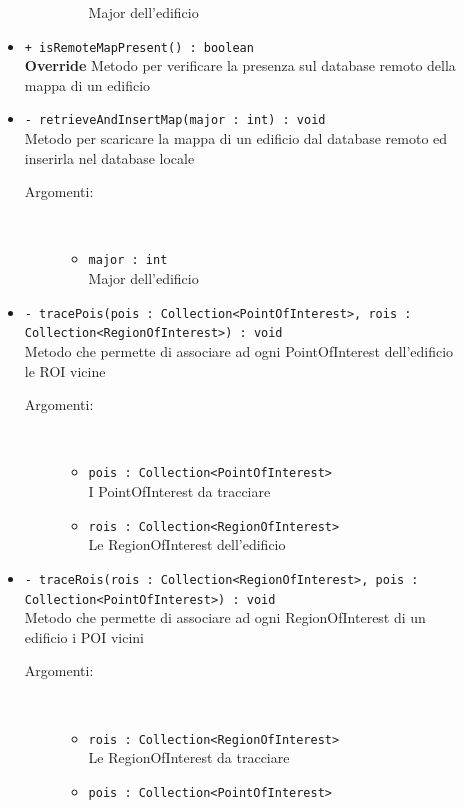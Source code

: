 \documentclass[../DefinizioneDiProdotto.tex]{subfiles}
\begin{document}
\begin{description}
\begin{itemize}
\begin{description}
\begin{itemize}
				Major dell'edificio\end{itemize}
		\end{description}
		\item \texttt{+ isRemoteMapPresent() : boolean}\\
		\textbf{Override} Metodo per verificare la presenza sul database remoto della mappa di un edificio
		\item \texttt{- retrieveAndInsertMap(major : int) : void}\\
		Metodo per scaricare la mappa di un edificio dal database remoto ed inserirla nel database locale
		\begin{description}
			\item[Argomenti:] \
			\begin{itemize}
				\item \texttt{major : int}\\
				Major dell'edificio\end{itemize}
		\end{description}
		\item \texttt{- tracePois(pois : Collection<PointOfInterest>, rois : Collection<RegionOfInterest>) : void}\\
		Metodo che permette di associare ad ogni PointOfInterest dell'edificio le ROI vicine
		\begin{description}
			\item[Argomenti:] \
			\begin{itemize}
				\item \texttt{pois : Collection<PointOfInterest>}\\
				I PointOfInterest da tracciare\item \texttt{rois : Collection<RegionOfInterest>}\\
				Le RegionOfInterest dell'edificio\end{itemize}
		\end{description}
		\item \texttt{- traceRois(rois : Collection<RegionOfInterest>, pois : Collection<PointOfInterest>) : void}\\
		Metodo che permette di associare ad ogni RegionOfInterest di un edificio i POI vicini
		\begin{description}
			\item[Argomenti:] \
			\begin{itemize}
				\item \texttt{rois : Collection<RegionOfInterest>}\\
				Le RegionOfInterest da tracciare\item \texttt{pois : Collection<PointOfInterest>}\\

\end{itemize}
\end{description}
\end{itemize}
\end{description}
\end{document}
